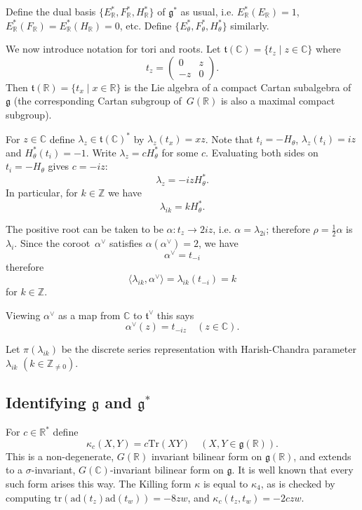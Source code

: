 \documentclass[10pt,leqno]{article}
\numberwithin{equation}{section}
\newcommand{\ad}{\mathrm{ad}}
\newcommand{\R}{\mathbb R}
\newcommand{\C}{\mathbb C}
\newcommand{\Z}{\mathbb Z}
\newcommand{\ch}[1]{#1^\vee}
\renewcommand{\t}{\mathfrak t}
\newcommand{\g}{\mathfrak g}
\begin{document}
Define the dual basis
 $\{E_\R^*,F_\R^*,H_\R^*\}$ of $\g^*$ as usual,  i.e. $E_\R^*(E_\R)=1$, $E_\R^*(F_\R)=E_\R^*(H_\R)=0$, etc. Define 
 $\{E_\theta^*,F_\theta^*,H_\theta^*\}$ similarly.
 
\medskip


We now introduce notation for tori and roots. Let $\t(\C)=\{t_z\mid z\in\C\}$ where
$$
t_z=\begin{pmatrix}0&z\\-z&0
\end{pmatrix}.
$$
Then $\t(\R)=\{t_x\mid x\in\R\}$ is the Lie algebra of a compact Cartan subalgebra of $\g$ (the corresponding Cartan subgroup of~$G(\R)$ is also a maximal compact subgroup).




For $z\in \C$ define $\lambda_z\in \t(\C)^*$ by $\lambda_z(t_x)=xz$.
Note that $t_i=-H_\theta$, $\lambda_z(t_i)=iz$ and $H_\theta^*(t_i)=-1$.
Write $\lambda_z=cH_\theta^*$ for some $c$. Evaluating both sides on $t_i=-H_\theta$ gives
$c=-iz$:
\begin{equation}
\label{e:lambdaz}
\lambda_z=-izH_\theta^*.
\end{equation}
In particular, for $k \in \Z$ we have
\begin{equation}
\label{e:lambdai}
\lambda_{ik}=kH_\theta^*.
\end{equation}


The positive root can be taken to be   $\alpha\colon t_z \to 2iz$, i.e.
$\alpha=\lambda_{2i}$; therefore $\rho=\frac12\alpha$ is~$\lambda_i$.
Since the coroot~$\ch\alpha$ satisfies $\alpha(\ch\alpha)=2$, we have
$$
\ch\alpha=t_{-i}
$$
therefore
$$
\langle \lambda_{ik},\ch\alpha\rangle=\lambda_{ik}(t_{-i})=k
$$
for $k \in \Z$. 

Viewing $\ch\alpha$ as a map from $\C$ to $\ch{\mathfrak t}$ this says
$$
\ch\alpha(z)=t_{-iz}\quad (z\in \C).
$$

Let $\pi(\lambda_{ik})$ be the discrete series representation with Harish-Chandra parameter $\lambda_{ik}$ $(k\in \Z_{\ne 0})$.

\subsection{Identifying  $\g$ and $\g^*$}


For $c\in \R^*$ define
$$
\kappa_c(X,Y)=c\mathrm{Tr}(XY)\quad (X,Y\in \g(\R)).
$$
This is a non-degenerate, $G(\R)$ invariant bilinear form on $\g(\R)$, and extends to a $\sigma$-invariant, $G(\C)$-invariant bilinear form on $\g$. 
It is well known that every such form arises this way.
The Killing form $\kappa$ is equal to $\kappa_4$, 
as is checked by computing  $\mathrm{tr}(\ad(t_z)\ad(t_w))=-8zw$, and 
 $\kappa_c(t_z,t_w)=-2czw$.
\end{document}
